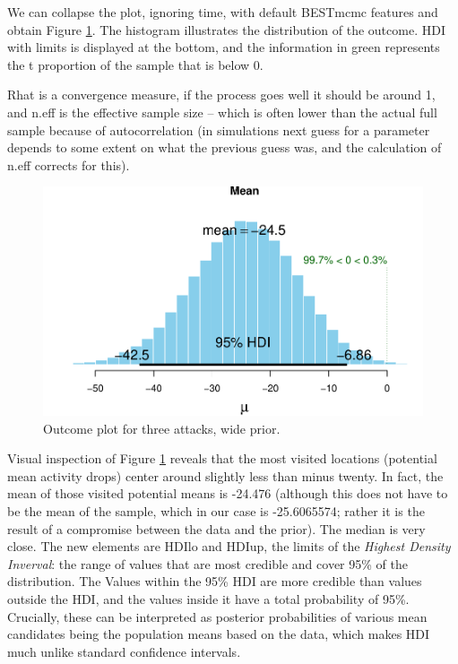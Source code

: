 \documentclass[10pt,]{scrartcl}
\begin{document}
We can collapse the plot, ignoring time, with default \textsf{BESTmcmc}
features and obtain Figure \ref{fig:mw3plot}. The histogram illustrates
the distribution of the outcome. HDI with limits is displayed at the
bottom, and the information in green represents the t proportion of the
sample that is below 0.

Rhat is a convergence measure, if the process goes well it should be
around 1, and \textsf{n.eff} is the effective sample size -- which is
often lower than the actual full sample because of autocorrelation (in
simulations next guess for a parameter depends to some extent on what
the previous guess was, and the calculation of \textsf{n.eff} corrects
for this).

\begin{figure}[h!]

\begin{center}\includegraphics[width=1\linewidth]{redditAnalysisWalkthrough_files/figure-latex/unnamed-chunk-54-1} \end{center}
\caption{Outcome plot for three attacks, wide prior.}
\label{fig:mw3plot}
\end{figure}

Visual inspection of Figure \ref{fig:mw3plot} reveals that the most
visited locations (potential mean activity drops) center around slightly
less than minus twenty. In fact, the mean of those visited potential
means is -24.476 (although this does not have to be the mean of the
sample, which in our case is -25.6065574; rather it is the result of a
compromise between the data and the prior). The median is very close.
The new elements are HDIlo and HDIup, the limits of the
\emph{Highest Density Inverval}: the range of values that are most
credible and cover 95\% of the distribution. The Values within the 95\%
HDI are more credible than values outside the HDI, and the values inside
it have a total probability of 95\%. Crucially, these can be interpreted
as posterior probabilities of various mean candidates being the
population means based on the data, which makes HDI much unlike standard
confidence intervals.
\end{document}
